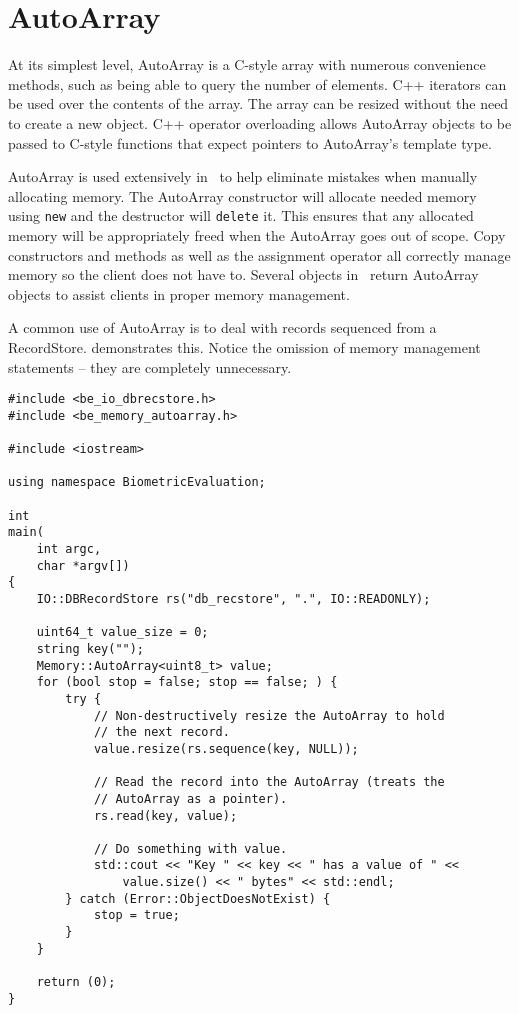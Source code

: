\section{AutoArray}
\label{sec-autoarray}
At its simplest level, AutoArray is a C-style array with numerous convenience 
methods, such as being able to query the number of elements.  C++ iterators
can be used over the contents of the array.  The array can be resized without
the need to create a new object.  C++ operator overloading allows AutoArray
objects to be passed to C-style functions that expect pointers to AutoArray's
template type.

AutoArray is used extensively in \sname\ to help eliminate mistakes when
manually allocating memory.  The AutoArray constructor will allocate needed
memory using {\tt new} and the destructor will {\tt delete} it.  This ensures
that any allocated memory will be appropriately freed when the AutoArray goes
out of scope.  Copy constructors and methods as well as the assignment operator
all correctly manage memory so the client does not have to.  Several objects in
\sname\ return AutoArray objects to assist clients in proper memory management.

A common use of AutoArray is to deal with records sequenced from a
RecordStore.  demonstrates this.  Notice the
omission of memory management statements -- they are completely unnecessary.

\begin{lstlisting}[caption={Using \nameref{sec-autoarray} with RecordStores}, label=autoarrayrsuse]
#include <be_io_dbrecstore.h>
#include <be_memory_autoarray.h>

#include <iostream>

using namespace BiometricEvaluation;

int
main(
    int argc,
    char *argv[])
{
	IO::DBRecordStore rs("db_recstore", ".", IO::READONLY);

	uint64_t value_size = 0;
	string key("");
	Memory::AutoArray<uint8_t> value;
	for (bool stop = false; stop == false; ) {
		try {
			// Non-destructively resize the AutoArray to hold
			// the next record.
			value.resize(rs.sequence(key, NULL));

			// Read the record into the AutoArray (treats the
			// AutoArray as a pointer).
			rs.read(key, value);

			// Do something with value.
			std::cout << "Key " << key << " has a value of " <<
			    value.size() << " bytes" << std::endl;
		} catch (Error::ObjectDoesNotExist) {
			stop = true;
		}
	}

	return (0);
}
\end{lstlisting}

